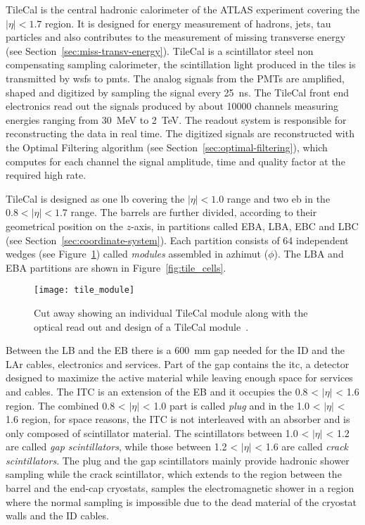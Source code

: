 TileCal is the central hadronic calorimeter of the ATLAS experiment covering the
$|\eta| < 1.7$ region. It is designed for energy measurement of hadrons, jets,
tau particles and also contributes to the measurement of missing transverse
energy (see Section~\ref{sec:miss-transv-energy}). TileCal is a scintillator
steel non compensating sampling calorimeter, the scintillation light produced in
the tiles is transmitted by \glspl{wsf} to \glspl{pmt}. The analog signals from
the PMTs are amplified, shaped and digitized by sampling the signal every
25~ns. The TileCal front end electronics read out the signals produced by about
10000 channels measuring energies ranging from 30~MeV to 2~TeV. The readout
system is responsible for reconstructing the data in real time. The digitized
signals are reconstructed with the Optimal Filtering algorithm (see
Section~\ref{sec:optimal-filtering}), which computes for each channel the signal
amplitude, time and quality factor at the required high rate.

TileCal is designed as one \gls{lb} covering the $|\eta| < 1.0$ range and two
\gls{eb} in the $0.8 < |\eta| < 1.7$ range. The barrels are further divided,
according to their geometrical position on the $z$-axis, in partitions called
EBA, LBA, EBC and LBC (see Section~\ref{sec:coordinate-system}). Each partition
consists of 64 independent wedges (see Figure~\ref{fig:tile_mod}) called
\emph{modules} assembled in azhimut ($\phi$). The LBA and EBA partitions are
shown in Figure~\ref{fig:tile_cells}.

\begin{figure}[!h]
  \centering
    \texttt{[image: tile\_module]}
    \caption{Cut away showing an individual TileCal module along with the
      optical read out and design of a TileCal module~\cite{TileModule}.}
    \label{fig:tile_mod}
\end{figure}

Between the LB and the EB there is a 600~mm gap needed for the ID and the LAr
cables, electronics and services. Part of the gap contains the \gls{itc}, a
detector designed to maximize the active material while leaving enough space for
services and cables. The ITC is an extension of the EB and it occupies the 0.8 <
$|\eta|$ < 1.6 region. The combined 0.8 < $|\eta|$ < 1.0 part is called
\emph{plug} and in the 1.0 < $|\eta|$ < 1.6 region, for space reasons, the ITC
is not interleaved with an absorber and is only composed of scintillator
material. The scintillators between 1.0 < $|\eta|$ < 1.2 are called \emph{gap
  scintillators}, while those between 1.2 < $|\eta|$ < 1.6 are called
\emph{crack scintillators}. The plug and the gap scintillators mainly provide
hadronic shower sampling while the crack scintillator, which extends to the
region between the barrel and the end-cap cryostats, samples the electromagnetic
shower in a region where the normal sampling is impossible due to the dead
material of the cryostat walls and the ID cables.

